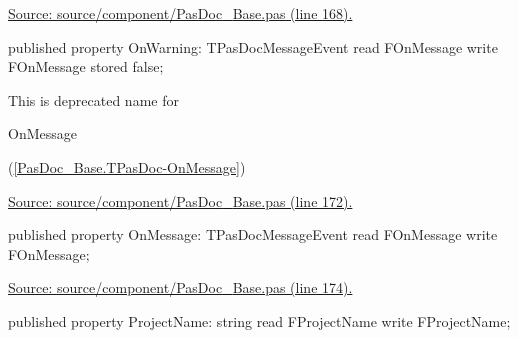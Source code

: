 \documentclass{report}
\newif\ifpdf
\begin{document}
\begin{list}{}
\begin{flushleft}
\ifpdf
\end{flushleft}
\fi


\par  \par
\href{https://github.com/pasdoc/pasdoc/blob/master/source/component/PasDoc_Base.pas#L168}{Source: source/component/PasDoc{\_}Base.pas (line 168).}\label{PasDoc_Base.TPasDoc-OnWarning}
\item[\textbf{OnWarning}\hfill]
\ifpdf
\begin{flushleft}
\fi
\begin{ttfamily}
published property OnWarning: TPasDocMessageEvent read FOnMessage write FOnMessage stored false;\end{ttfamily}

\ifpdf
\end{flushleft}
\fi


\par This is deprecated name for \begin{ttfamily}OnMessage\end{ttfamily}(\ref{PasDoc_Base.TPasDoc-OnMessage})\par
\href{https://github.com/pasdoc/pasdoc/blob/master/source/component/PasDoc_Base.pas#L172}{Source: source/component/PasDoc{\_}Base.pas (line 172).}\label{PasDoc_Base.TPasDoc-OnMessage}
\item[\textbf{OnMessage}\hfill]
\ifpdf
\begin{flushleft}
\fi
\begin{ttfamily}
published property OnMessage: TPasDocMessageEvent read FOnMessage write FOnMessage;\end{ttfamily}

\ifpdf
\end{flushleft}
\fi


\par  \par
\href{https://github.com/pasdoc/pasdoc/blob/master/source/component/PasDoc_Base.pas#L174}{Source: source/component/PasDoc{\_}Base.pas (line 174).}\label{PasDoc_Base.TPasDoc-ProjectName}
\item[\textbf{ProjectName}\hfill]
\ifpdf
\begin{flushleft}
\fi
\begin{ttfamily}
published property ProjectName: string read FProjectName write FProjectName;\end{ttfamily}

\ifpdf
\end{flushleft}
\fi



\end{list}
\end{document}
